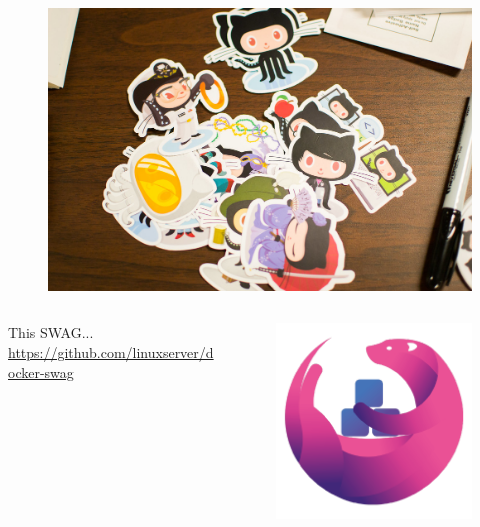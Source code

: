 \documentclass{beamer}
\begin{document}
\begin{frame}
    \begin{figure}
        \centering
        \includegraphics[width=\textwidth,keepaspectratio]{../resources/wrong_swag3.jpg}
    \end{figure}
\end{frame}

\begin{frame}
    \begin{columns}
        \begin{column}{0.7\textwidth}
            This SWAG... \href{https://github.com/linuxserver/docker-swag}{https://github.com/linuxserver/docker-swag}
        \end{column}
        \begin{column}{0.3\textwidth}
            \begin{figure}
                \centering
                \includegraphics[width=\textwidth,keepaspectratio]{../resources/swag.png}
            \end{figure}
        \end{column}
    \end{columns}
\end{frame}
\end{document}
